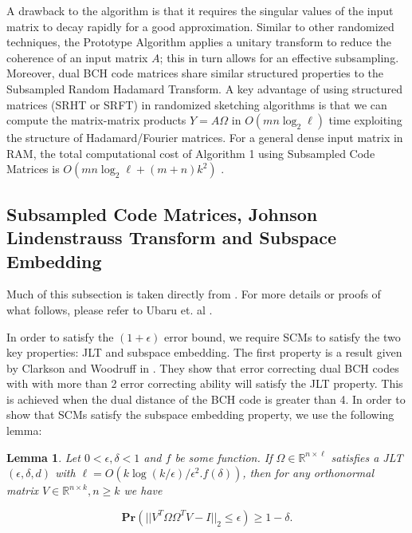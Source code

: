 \documentclass[12pt]{article}
\newcommand{\mB}{\mathbb}
\newtheorem{lemma}{Lemma}
\begin{document}
\vspace{3mm}

A drawback to the algorithm is that it requires the singular values of the input matrix to decay rapidly for a good approximation.  Similar to other randomized techniques, the Prototype Algorithm applies a unitary transform to reduce the coherence of an input matrix $A$; this in turn allows for an effective subsampling. Moreover, dual BCH code matrices share similar structured properties to the Subsampled Random Hadamard Transform. A key advantage of using structured matrices (SRHT or SRFT) in randomized sketching algorithms is that we can compute the  matrix-matrix products $Y = A \Omega$ in $O(m n \log_2 \ell)$ time exploiting the structure of Hadamard/Fourier matrices. For a general dense input matrix in RAM, the total computational cost of Algorithm 1 using Subsampled Code Matrices is $O(mn \log_2 \ell + (m + n) k^2)$ \cite{ubaru2015low}. 

\subsection{Subsampled Code Matrices, Johnson Lindenstrauss Transform and Subspace Embedding}

Much of this subsection is taken directly from \cite{ubaru2015low}. For more details or proofs of what follows, please refer to Ubaru et. al \cite{ubaru2015low}. 

\vspace{3mm}

In order to satisfy the $(1 + \epsilon)$ error bound, we require SCMs to satisfy the two key properties: JLT and subspace embedding. The first property is a result given by Clarkson and Woodruff in \cite{clarkson2009numerical}. They show that error correcting dual BCH codes with with more than 2 error correcting ability will satisfy the JLT property. This is achieved when the dual distance of the BCH code is greater than 4. In order to show that SCMs satisfy the subspace embedding property, we use the following lemma:

\vspace{3mm}

\begin{lemma}
Let $0 < \epsilon, \delta < 1$ and $f$ be some function. If $\Omega \in \mB{R}^{n \times \ell}$ satisfies a JLT $(\epsilon, \delta, d)$ with $\ell = O(k \log(k/ \epsilon) / \epsilon^2 . f(\delta))$, then for any orthonormal matrix $V \in \mB{R}^{n \times k}, n \ge k$ we have 

\[ \textbf{Pr}( || V^T \Omega \Omega^T V - I ||_2 \le \epsilon) \ge 1 - \delta.\]
\end{lemma}
\end{document}

